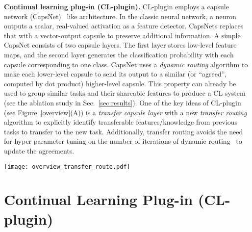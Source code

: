 \documentclass{article}
\begin{document}
\textbf{Continual learning plug-in (CL-plugin).} CL-plugin employs a capsule network (CapsNet)~\cite{hinton2011transforming,sabour2017dynamic} like architecture. In the classic neural network, a neuron outputs a scalar, real-valued activation as a feature detector. CapsNets replaces that with a vector-output capsule to preserve additional information. A simple CapsNet consists of two capsule layers. The first layer stores low-level feature maps, and the second layer generates the classification probability with each capsule corresponding to one class. CapsNet uses a \textit{dynamic routing} algorithm to make each lower-level capsule to send its output to a similar (or ``agreed'', {\color{black}computed by dot product)} 
higher-level capsule. This property can already be used to group similar tasks and their shareable
features to produce a CL system (see the ablation study in Sec.~\ref{sec:results}). 
One of the key ideas of CL-plugin (see Figure~\ref{overview}(A)) is
a \textit{transfer capsule layer} with a new \textit{transfer routing} algorithm to explicitly identify transferable features/knowledge from previous tasks to transfer to the new task.
Additionally, transfer routing avoids the need for hyper-parameter tuning on the number of iterations of dynamic routing~\cite{sabour2017dynamic}
to update the agreements. 














\begin{figure*}[t]
\centering
\texttt{[image: overview\_transfer\_route.pdf]}
\caption{\textbf{(A)} CL-plugin Architecture.
\textbf{(B)} Illustration of task masking. {Cells/neurons in brown, green and red are respectively used by tasks 0, 1 and 2. Neurons with two colors are used by two tasks} }
\vspace{-3mm}
\label{overview}
\end{figure*}









\section{Continual Learning Plug-in (CL-plugin)}
\end{document}
